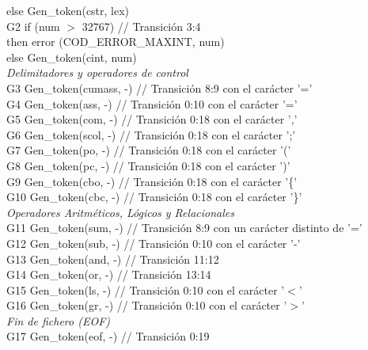 \begin{tabbing}
    \> \hspace{1cm}else Gen\_token(cstr, lex) \\
    \> G2 \> if (num $>$ 32767) \> // Transición 3:4 \\
    \> \hspace{1.5cm} then error (COD\_ERROR\_MAXINT, num) \\
    \> \hspace{1cm}else Gen\_token(cint, num) \\
    \textit{Delimitadores y operadores de control} \\
    \> G3 \> Gen\_token(cumass, -) \> // Transición 8:9 con el carácter '='\\
    \> G4 \> Gen\_token(ass, -) \> // Transición 0:10 con el carácter '='\\
    \> G5 \> Gen\_token(com, -) \> // Transición 0:18 con el carácter ','\\
    \> G6 \> Gen\_token(scol, -) \> // Transición 0:18 con el carácter ';'\\
    \> G7 \> Gen\_token(po, -) \> // Transición 0:18 con el carácter '('\\
    \> G8 \> Gen\_token(pc, -) \> // Transición 0:18 con el carácter ')'\\
    \> G9 \> Gen\_token(cbo, -) \> // Transición 0:18 con el carácter '\{'\\
    \> G10 \> Gen\_token(cbc, -) \> // Transición 0:18 con el carácter '\}' \\
    \textit{Operadores Aritméticos, Lógicos y Relacionales} \\
    \> G11 \> Gen\_token(sum, -) \> // Transición 8:9 con un carácter distinto de '='\\
    \> G12 \> Gen\_token(sub, -) \> // Transición 0:10 con el carácter '-'\\
    \> G13 \> Gen\_token(and, -) \> // Transición 11:12 \\
    \> G14 \> Gen\_token(or, -) \> // Transición 13:14 \\
    \> G15 \> Gen\_token(ls, -) \> // Transición 0:10 con el carácter '$<$'\\
    \> G16 \> Gen\_token(gr, -) \> // Transición 0:10 con el carácter '$>$'\\
    \textit{Fin de fichero (EOF)} \\
    \> G17 \> Gen\_token(eof, -) \> // Transición 0:19 \\
\end{tabbing}
\newpage
